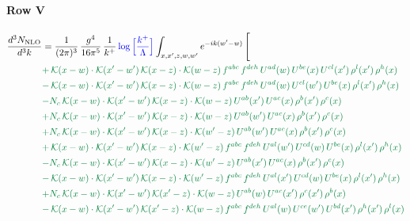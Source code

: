 \documentclass[10pt]{article}
\numberwithin{equation}{section}
\newcommand{\new}[1]{{\color{blue}#1}}
\begin{document}
\paragraph{Row V}
\begin{align}
\frac{d^{3}N_{\mathrm{NLO}}}{d^{3}k} & = \frac{1}{(2\pi)^{3}}\,\frac{g^{4}}{16\pi^{5}}\,\frac{1}{k^{+}}\,\new{\log\Big[\frac{k^{+}}{\Lambda}\Big]}\int_{x,x',z,w,w'}e^{-ik(w'-w)}\,\Bigg[\notag\\ &{\color{JIM}  +\,\mathcal{K}(x-w)\cdot\mathcal{K}(x'-w')\,\mathcal{K}(x-z)\cdot\mathcal{K}(w-z)\,f^{abc}\,f^{deh}\,U^{ad}(w)\,U^{be}(x)\,U^{cl}(x')\,\rho^{l}(x')\,\rho^{h}(x)} \notag\\
&{\color{JIM} -\,\mathcal{K}(x-w)\cdot\mathcal{K}(x'-w')\,\mathcal{K}(x-z)\cdot\mathcal{K}(w-z)\,f^{abc}\,f^{deh}\,U^{ad}(w)\,U^{cl}(w')\,U^{be}(x)\,\rho^{l}(x')\,\rho^{h}(x)} \notag\\
&{\color{JIM} -N_{c}\,\mathcal{K}(x-w)\cdot\mathcal{K}(x'-w')\,\mathcal{K}(x-z)\cdot\mathcal{K}(w-z)\,U^{ab}(x')\,U^{ac}(x)\,\rho^{b}(x')\,\rho^{c}(x)} \notag\\
&{\color{JIM} +N_{c}\,\mathcal{K}(x-w)\cdot\mathcal{K}(x'-w')\,\mathcal{K}(x-z)\cdot\mathcal{K}(w-z)\,U^{ab}(w')\,U^{ac}(x)\,\rho^{b}(x')\,\rho^{c}(x)} \notag\\
&{\color{JIM} +N_{c}\,\mathcal{K}(x-w)\cdot\mathcal{K}(x'-w')\,\mathcal{K}(x-z)\cdot\mathcal{K}(w'-z)\,U^{ab}(w')\,U^{ac}(x)\,\rho^{b}(x')\,\rho^{c}(x)} \notag\\
&{\color{JIM} +\,\mathcal{K}(x-w)\cdot\mathcal{K}(x'-w')\,\mathcal{K}(x-z)\cdot\mathcal{K}(w'-z)\,f^{abc}\,f^{deh}\,U^{al}(w')\,U^{cd}(w)\,U^{be}(x)\,\rho^{l}(x')\,\rho^{h}(x)} \notag\\
&{\color{JIM} -N_{c}\,\mathcal{K}(x-w)\cdot\mathcal{K}(x'-w')\,\mathcal{K}(x-z)\cdot\mathcal{K}(w'-z)\,U^{ab}(x')\,U^{ac}(x)\,\rho^{b}(x')\,\rho^{c}(x)} \notag\\
&{\color{JIM} -\,\mathcal{K}(x-w)\cdot\mathcal{K}(x'-w')\,\mathcal{K}(x-z)\cdot\mathcal{K}(w'-z)\,f^{abc}\,f^{deh}\,U^{al}(x')\,U^{cd}(w)\,U^{be}(x)\,\rho^{l}(x')\,\rho^{h}(x)} \notag\\
&{\color{JIM} +N_{c}\,\mathcal{K}(x-w)\cdot\mathcal{K}(x'-w')\,\mathcal{K}(x'-z)\cdot\mathcal{K}(w-z)\,U^{ab}(w)\,U^{ac}(x')\,\rho^{c}(x')\,\rho^{b}(x)} \notag\\
&{\color{JIM} -\,\mathcal{K}(x-w)\cdot\mathcal{K}(x'-w')\,\mathcal{K}(x'-z)\cdot\mathcal{K}(w-z)\,f^{abc}\,f^{deh}\,U^{al}(w)\,U^{ce}(w')\,U^{bd}(x')\,\rho^{h}(x')\,\rho^{l}(x)} \notag\\

\end{align}
\end{document}
